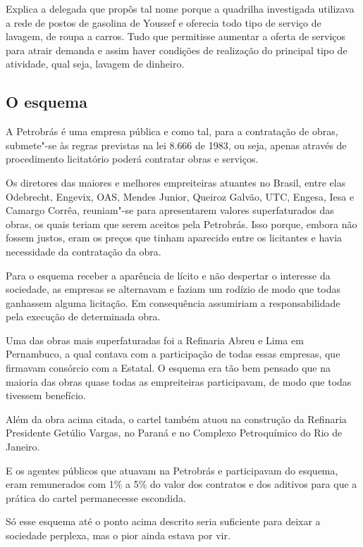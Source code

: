 {Explica a delegada que propôs tal nome porque a quadrilha investigada
utilizava a rede de postos de gasolina de Youssef e oferecia todo tipo
de serviço de lavagem, de roupa a carros. Tudo que permitisse aumentar a
oferta de serviços para atrair demanda e assim haver condições de
realização do principal tipo de atividade, qual seja, lavagem de
dinheiro.

\subsection{O esquema}

A Petrobrás é uma empresa pública e como tal, para a contratação de
obras, submete"-se às regras previstas na lei 8.666 de 1983, ou seja,
apenas através de procedimento licitatório poderá contratar obras e
serviços.

Os diretores das maiores e melhores empreiteiras atuantes no Brasil,
entre elas Odebrecht, Engevix, OAS, Mendes Junior, Queiroz Galvão, UTC,
Engesa, Iesa e Camargo Corrêa, reuniam"-se para apresentarem valores
superfaturados das obras, os quais teriam que serem aceitos pela
Petrobrás. Isso porque, embora não fossem justos, eram os preços que
tinham aparecido entre os licitantes e havia necessidade da contratação
da obra.

Para o esquema receber a aparência de lícito e não despertar o interesse
da sociedade, as empresas se alternavam e faziam um rodízio de modo que
todas ganhassem alguma licitação. Em consequência assumiriam a
responsabilidade pela execução de determinada obra.

Uma das obras mais superfaturadas foi a Refinaria Abreu e Lima em
Pernambuco, a qual contava com a participação de todas essas empresas,
que firmavam consórcio com a Estatal. O esquema era tão bem pensado que
na maioria das obras quase todas as empreiteiras participavam, de modo
que todas tivessem benefício.

Além da obra acima citada, o cartel também atuou na construção da
Refinaria Presidente Getúlio Vargas, no Paraná e no Complexo
Petroquímico do Rio de Janeiro.

E os agentes públicos que atuavam na Petrobrás e participavam do
esquema, eram remunerados com 1\% a 5\% do valor dos contratos e dos
aditivos para que a prática do cartel permanecesse escondida.

Só esse esquema até o ponto acima descrito seria suficiente para deixar
a sociedade perplexa, mas o pior ainda estava por vir.

}
